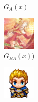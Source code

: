 \documentclass[twocolumn,11pt]{ctexart}
\begin{document}
\begin{figure}[htb]
\begin{subfigure}[b]{0.23\linewidth}
        \caption{$G_A(x)$}
      \end{subfigure}
      \begin{subfigure}[b]{0.23\linewidth}
        \includegraphics[width=\linewidth]{exp2_epoch100_rec_A.png}
        \caption{$G_{BA}(x))$}
      \end{subfigure}
      \begin{subfigure}[b]{0.23\linewidth}
        \includegraphics[width=\linewidth]{exp2_epoch100_idt_A.png}

\end{subfigure}
\end{figure}
\end{document}
